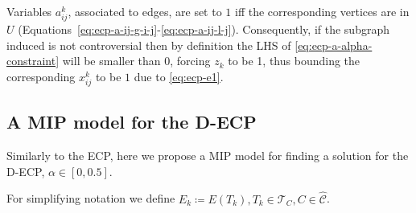 Variables $a_{ij}^{k}  $, associated to edges, are set to $1$ iff the
corresponding vertices are in $U$
(Equations~\ref{eq:ecp-a-ij-g-i-j}-\ref{eq:ecp-a-ij-l-j}). Consequently, if the
subgraph induced is not controversial then by definition the LHS of
\autoref{eq:ecp-a-alpha-constraint} will be smaller than $0$, forcing $z_k$ to
be 1, thus bounding the corresponding $x_{ij} ^{k} $ to be $1$ due to
\autoref{eq:ecp-e1}.


\subsection{A MIP model for the \acrshort{D-ECP}}%
\label{sub:a_mip_model_for_the_d_ecp}

Similarly to the \acrshort{ECP}, here we propose a \acrshort{MIP} model for
finding a solution for the \acrshort{D-ECP}, $\alpha \in [0, 0.5]$.

For simplifying notation we define $E_{k} \coloneqq E(T_{k}), T_{k} \in
	\mathcal{T}_{C}, C \in \mathcal{\hat{C}}$.

